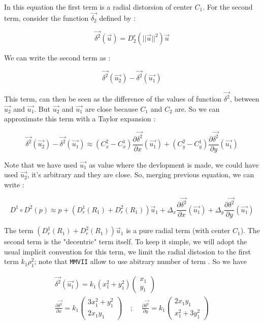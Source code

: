 In this equation the first term is a radial distorsion of center $C_1$. For the second term,
consider the function $\vec{\delta_2}$ defined by :

\begin{equation}
	\vec{\delta^2}(\vec{u}) =  D^r_2(||\vec{u}||^2) \vec{u}
\end{equation}

We can write the second term as :

\begin{equation}
	\vec{\delta^2}(\vec{u_2})  - \vec{\delta^2}(\vec{u_1})
\end{equation}

This term, can then be seen as the difference of the values of function $\vec{\delta^2}$, between $\vec{u_2}$
and $\vec{u_1}$.  But $\vec{u_2}$ and $\vec{u_1}$ are close because
$C_1$ and $C_2$ are. So we can approximate this term with  a Taylor expansion :

\begin{equation}
	\vec{\delta^2}(\vec{u_2})  - \vec{\delta^2}(\vec{u_1})
	\approx
	(C^2_x - C^1_x) \frac{\partial{\vec{\delta^2}}}{\partial x} (\vec{u_1})
     + 	(C^2_y - C^1_y) \frac{\partial{\vec{\delta^2}}}{\partial y}  (\vec{u_1})
\end{equation}

Note that we have used $\vec{u_1}$ as value where the devlopment is made, we could have used $\vec{u_2}$,
it's arbitrary and they are close.
So, merging previous equation, we can write :

\begin{equation}
	D^1 \circ D^2 (p) 
	\approx
	  p +    (D^1_r(R_1) + D^2_r(R_1))  \vec{u}_1  
	  +  \Delta_x \frac{\partial{\vec{\delta^2}}}{\partial x} (\vec{u_1})
          +  \Delta_y \frac{\partial{\vec{\delta^2}}}{\partial y}  (\vec{u_1})
\end{equation}

The term $(D^1_r(R_1) + D^2_r(R_1))  \vec{u}_1 $ is a pure radial term 
(with center $C_1$).    The second term is the "decentric" term itself.
To keep it simple, we will adopt the usual implicit convention for this term,
we limit the radial distosion to the first term $k_1 \rho_1^2$; note that {\tt MMVII} allow to use 
abitrary number of term .  So we have

\begin{equation}
\begin{multlined}
	\vec{\delta^2} (\vec{u_1}) = k_1(x_1^2+y_1^2)  \begin{pmatrix} x_1  \\ y_1 \end{pmatrix} \\
%
		\frac{\partial{\vec{\delta^2}}}{\partial x} 
		=  k_1 \begin{pmatrix} 3 x_1^2 + y_1^2    \\ 2 x_1 y_1  \end{pmatrix}
%
			\;\;\;\;   ; \;\;\;\;   
		\frac{\partial{\vec{\delta^2}}}{\partial y} 
		=  k_1 \begin{pmatrix} 2 x_1 y_1 \\ x_1^2 + 3 y_1^2  \end{pmatrix}
\end{multlined}
\end{equation}


